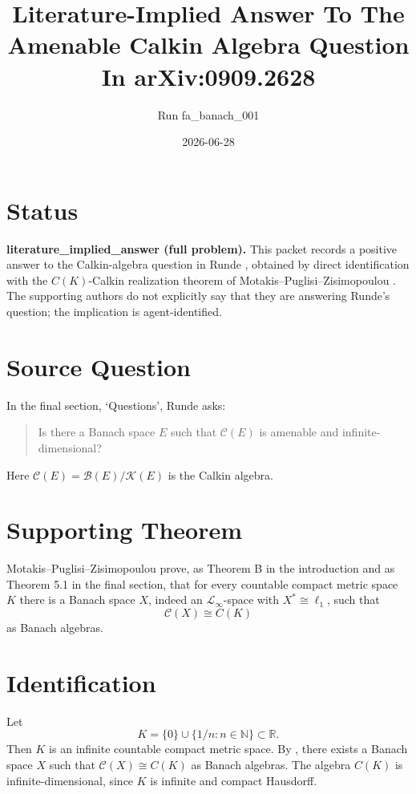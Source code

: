 \documentclass[11pt]{article}
\title{Literature-Implied Answer To The Amenable Calkin Algebra Question In arXiv:0909.2628}
\author{Run fa\_banach\_001}
\date{2026-06-28}
\begin{document}
\maketitle

\section*{Status}

\textbf{literature\_implied\_answer (full problem).}
This packet records a positive answer to the Calkin-algebra question in
Runde \cite{Runde2009}, obtained by direct identification with the
\(C(K)\)-Calkin realization theorem of Motakis--Puglisi--Zisimopoulou
\cite{MPZ2014}.  The supporting authors do not explicitly say that they
are answering Runde's question; the implication is agent-identified.

\section*{Source Question}

In the final section, `Questions', Runde asks:
\begin{quote}
Is there a Banach space \(E\) such that \(\mathcal C(E)\) is amenable and
infinite-dimensional?
\end{quote}
Here \(\mathcal C(E)=\mathcal B(E)/\mathcal K(E)\) is the Calkin algebra.

\section*{Supporting Theorem}

Motakis--Puglisi--Zisimopoulou prove, as Theorem B in the introduction
and as Theorem 5.1 in the final section, that for every countable compact
metric space \(K\) there is a Banach space \(X\), indeed an
\(\mathcal L_\infty\)-space with \(X^*\cong \ell_1\), such that
\[
\mathcal C(X)\cong C(K)
\]
as Banach algebras.

\section*{Identification}

Let
\[
K=\{0\}\cup \{1/n:n\in \mathbb N\}\subset \mathbb R.
\]
Then \(K\) is an infinite countable compact metric space.  By
\cite{MPZ2014}, there exists a Banach space \(X\) such that
\(\mathcal C(X)\cong C(K)\) as Banach algebras.  The algebra \(C(K)\) is
infinite-dimensional, since \(K\) is infinite and compact Hausdorff.
\end{document}

